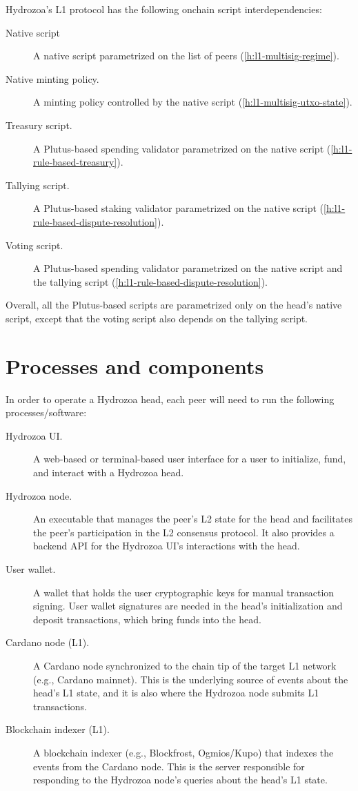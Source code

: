 \documentclass[../hydrozoa.tex]{subfiles}
\begin{document}
Hydrozoa's L1 protocol has the following onchain script interdependencies:
\begin{description}
  \item[Native script] A native script parametrized on the list of peers (\cref{h:l1-multisig-regime}).
  \item[Native minting policy.] A minting policy controlled by the native script (\cref{h:l1-multisig-utxo-state}).
  \item[Treasury script.] A Plutus-based spending validator parametrized on the native script (\cref{h:l1-rule-based-treasury}).
  \item[Tallying script.] A Plutus-based staking validator parametrized on the native script (\cref{h:l1-rule-based-dispute-resolution}).
  \item[Voting script.] A Plutus-based spending validator parametrized on the native script and the tallying script (\cref{h:l1-rule-based-dispute-resolution}).
\end{description}

Overall, all the Plutus-based scripts are parametrized only on the head's native script, except that the voting script also depends on the tallying script.

\section{Processes and components}%
\label{h:architecture-processes-and-components}%

In order to operate a Hydrozoa head, each peer will need to run the following processes/software:
\begin{description}
  \item[Hydrozoa UI.] A web-based or terminal-based user interface for a user to initialize, fund, and interact with a Hydrozoa head.
  \item[Hydrozoa node.] An executable that manages the peer's L2 state for the head and facilitates the peer's participation in the L2 consensus protocol.
    It also provides a backend API for the Hydrozoa UI's interactions with the head.
  \item[User wallet.] A wallet that holds the user cryptographic keys for manual transaction signing.
    User wallet signatures are needed in the head's initialization and deposit transactions, which bring funds into the head.
  \item[Cardano node (L1).] A Cardano node synchronized to the chain tip of the target L1 network (e.g., Cardano mainnet).
    This is the underlying source of events about the head's L1 state, and it is also where the Hydrozoa node submits L1 transactions.
  \item[Blockchain indexer (L1).] A blockchain indexer (e.g., Blockfrost, Ogmios/Kupo) that indexes the events from the Cardano node.
    This is the server responsible for responding to the Hydrozoa node's queries about the head's L1 state.
\end{description}
\end{document}
